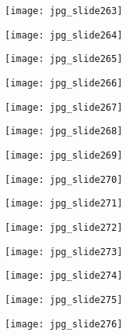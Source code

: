 \documentclass[main.tex]{subfiles}
\begin{document}
\begin{center}
\texttt{[image: jpg\_slide263]}
\end{center}

\begin{center}
\texttt{[image: jpg\_slide264]}
\end{center}

\begin{center}
\texttt{[image: jpg\_slide265]}
\end{center}

\begin{center}
\texttt{[image: jpg\_slide266]}
\end{center}

\begin{center}
\texttt{[image: jpg\_slide267]}
\end{center}

\begin{center}
\texttt{[image: jpg\_slide268]}
\end{center}

\begin{center}
\texttt{[image: jpg\_slide269]}
\end{center}

\begin{center}
\texttt{[image: jpg\_slide270]}
\end{center}

\begin{center}
\texttt{[image: jpg\_slide271]}
\end{center}

\begin{center}
\texttt{[image: jpg\_slide272]}
\end{center}

\begin{center}
\texttt{[image: jpg\_slide273]}
\end{center}

\begin{center}
\texttt{[image: jpg\_slide274]}
\end{center}

\begin{center}
\texttt{[image: jpg\_slide275]}
\end{center}

\begin{center}
\texttt{[image: jpg\_slide276]}
\end{center}
\end{document}

